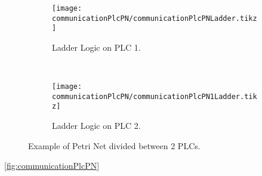 \begin{figure}[H]
    \centering
    \begin{subfigure}[t]{0.5\textwidth}
        \centering
        \texttt{[image: communicationPlcPN/communicationPlcPNLadder.tikz]}
        \caption{Ladder Logic on PLC 1.}
        \label{fig:communicationPlcPN}
    \end{subfigure}%
    ~ 
    \begin{subfigure}[t]{0.5\textwidth}
        \centering
        \texttt{[image: communicationPlcPN/communicationPlcPN1Ladder.tikz]}
  \caption{Ladder Logic on PLC 2.}
  \label{fig:communicationPlcPN1}
    \end{subfigure}
    \caption{Example of Petri Net divided between 2 PLCs.}
\end{figure}
  

\autoref{fig:communicationPlcPN}
